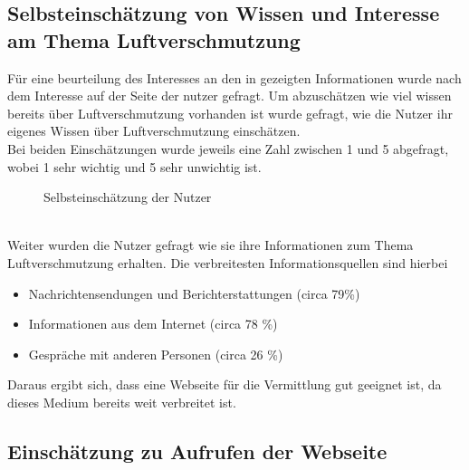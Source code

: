 \subsection{Selbsteinschätzung von Wissen und Interesse am Thema Luftverschmutzung}
Für eine beurteilung des Interesses an den in \softwarename gezeigten Informationen wurde nach dem Interesse auf der Seite der nutzer gefragt.
Um abzuschätzen wie viel wissen bereits über Luftverschmutzung vorhanden ist wurde gefragt, wie die Nutzer ihr eigenes Wissen über Luftverschmutzung einschätzen.
\\
Bei beiden Einschätzungen wurde jeweils eine Zahl zwischen 1 und 5 abgefragt, wobei 1 sehr wichtig und 5 sehr unwichtig ist.
\\
\begin{figure}[h]
    \caption{Selbsteinschätzung der Nutzer}
\end{figure}
\\
Weiter wurden die Nutzer gefragt wie sie ihre Informationen zum Thema Luftverschmutzung erhalten. Die verbreitesten Informationsquellen sind hierbei
\begin{itemize} [noitemsep]
    \item Nachrichtensendungen und Berichterstattungen (circa 79\%)
    \item Informationen aus dem Internet (circa 78 \%)
    \item Gespräche mit anderen Personen (circa 26 \%)
\end{itemize}
Daraus ergibt sich, dass eine Webseite für die Vermittlung gut geeignet ist, da dieses Medium bereits weit verbreitet ist.

\subsection{Einschätzung zu Aufrufen der Webseite}

